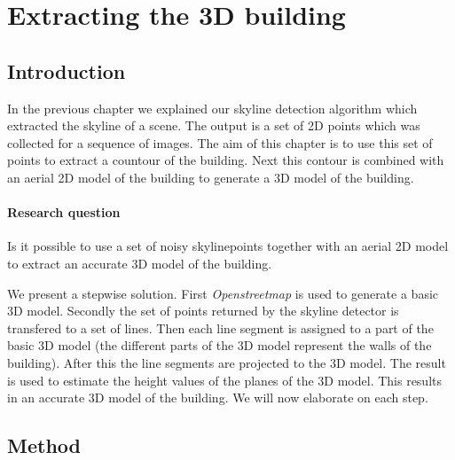 


\section{Extracting the 3D building}
\subsection{Introduction}
In the previous chapter we explained our skyline detection algorithm which
extracted the skyline of a scene. The output is a set of 2D points which was  
collected for a sequence of images.
The aim of this chapter is to use this set of points to extract a countour of
the building. Next this contour is combined with an aerial 2D model of the building to
generate a 3D model of the building.\\

\paragraph{Research question}
Is it possible to use a set of noisy skylinepoints together with an aerial 2D model to 
extract an accurate 3D model of the building.

We present a stepwise solution. First \emph{Openstreetmap} is used to generate a
basic 3D model. Secondly the set of points returned by the skyline detector is
transfered to a set of lines. Then each line segment is assigned to a part of
the basic 3D model (the different parts of the 3D model represent the walls of
the building).  After this the line segments are projected to the 3D model. The
result is used to estimate the height values of the planes of the 3D model.
This results in an accurate 3D model of the building.
We will now elaborate on each step.\\



\subsection{Method}

